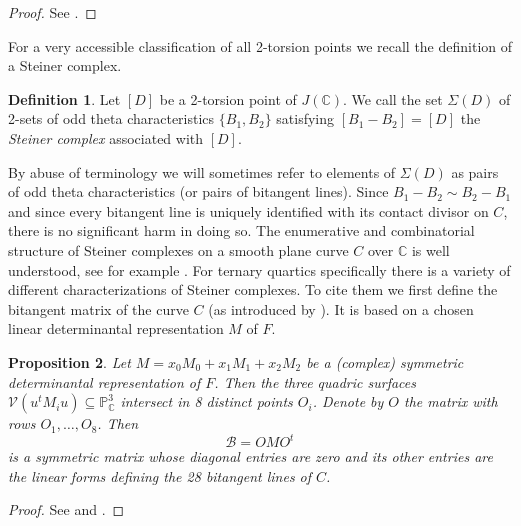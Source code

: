 \documentclass[a4paper,10pt]{amsart}
\theoremstyle{definition}
\newtheorem{Def}{Definition}[section]
\theoremstyle{plain}
\newtheorem{prop}[Def]{Proposition}
\newcommand{\cB}{{\mathcal B}}
\newcommand{\cV}{{\mathcal V}}
\newcommand{\C}{{\mathbb C}}
\newcommand{\pp}{\mathbb{P}}
\begin{document}
\begin{proof}
    See \cite[p.~456]{vin93}.
\end{proof}

For a very accessible classification of all 2-torsion points we recall the definition of a Steiner complex.

\begin{Def}
    Let $[D]$ be a 2-torsion point of $J(\C)$. We call the set $\Sigma(D)$ of 2-sets of odd theta characteristics $\{B_1, B_2\}$ satisfying $[B_1 - B_2] = [D]$ the \emph{Steiner complex} associated with $[D]$.
\end{Def}

By abuse of terminology we will sometimes refer to elements of $\Sigma(D)$ as pairs of odd theta characteristics (or pairs of bitangent lines). Since $B_1 - B_2 \sim B_2 - B_1$ and since every bitangent line is uniquely identified with its contact divisor on $C$, there is no significant harm in doing so. The enumerative and combinatorial structure of Steiner complexes on a smooth plane curve $C$ over $\C$ is well understood, see for example \cite[\S 5.4.2]{dolgachev}. For ternary quartics specifically there is a variety of different characterizations of Steiner complexes. To cite them we first define the bitangent matrix of the curve $C$ (as introduced by \cite[\S 3]{plaumann}). It is based on a chosen linear determinantal representation $M$ of $F$.

\begin{prop} \label{prop:bitmatrix}
    Let $M = x_0M_0 + x_1M_1 + x_2M_2$ be a (complex) symmetric determinantal representation of $F$. Then the three quadric surfaces $\cV(u^t M_i u) \subseteq \pp^3_\C$ intersect in 8 distinct points $O_i$. Denote by $O$ the matrix with rows $O_1, \dots, O_8$. Then
    \begin{equation*}
        \cB = O M O^t
    \end{equation*}
    is a symmetric matrix whose diagonal entries are zero and its other entries are the linear forms defining the 28 bitangent lines of $C$.
\end{prop}

\begin{proof}
    See \cite[\S 6.3.2]{dolgachev} and \cite[Proposition 3.3]{plaumann}.
\end{proof}
\end{document}
